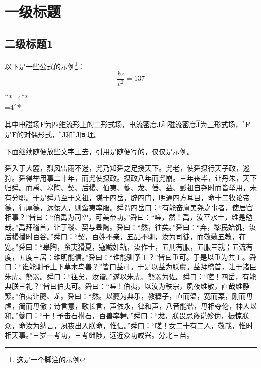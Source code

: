 \documentclass[UTF8,12pt,AutoFakeBold,fontset=fandol]{ctexart}
\begin{document}
	
	\newpage
	
	\section{一级标题\label{章节：正文部分}}
	\subsection{二级标题1\label{章节：二级标题1}}
	
	
	以下是一些公式的示例\footnote{这是一个脚注的示例}：
	\begin{equation}
		\frac{\hbar c}{e^2}=137
	\end{equation}
	\begin{subnumcases}{\label{式：绪论|对称的麦克斯韦方程组}}
		^*\!=4\pi^*\!\!\\
		=4\pi^*\!\!
	\end{subnumcases}
	其中电磁场$\bm{F}$为四维流形上的二形式场，电流密度$\bm{J}$和磁流密度$\hat{\bm{J}}$为三形式场，$^*\!\bm{F}$是$\bm{F}$的对偶形式，$^*\!\!\bm{J}$和$^*\!\!\hat{\bm{J}}$同理。
	\par
	下面继续随便放些文字上去，引用是随便写的，仅仅是示例。
	\par
	舜入于大麓，烈风雷雨不迷\cite{HOOFT1974276,PismaZhETF.20.430}，尧乃知舜之足授天下。尧老，使舜摄行天子政，巡狩。舜得举用事二十年，而尧使摄政。摄政八年而尧崩\cite{1975CMaPh..43..199H}。三年丧毕，让丹朱，天下归舜。而禹、皋陶、契、后稷、伯夷、夔、龙、倕、益、彭祖自尧时而皆举用，未有分职。于是舜乃至于文祖，谋于四岳，辟四门，明通四方耳目，命十二牧论帝德，行厚德，远佞人，则蛮夷率服。舜谓四岳曰：“有能奋庸美尧之事者，使居官相事？”皆曰：“伯禹为司空，可美帝功。”舜曰：“嗟，然！禹，汝平水土，维是勉哉。”禹拜稽首，让于稷、契与皋陶。舜曰：“然，往矣。”舜曰：“弃，黎民始饥，汝后稷播时百谷。”舜曰：“契，百姓不亲，五品不驯，汝为司徒\cite{PhysRevLett.43.1365,ZELDOVICH1978239,Weinberg_2012}，而敬敷五教，在宽。”舜曰：“皋陶，蛮夷猾夏，寇贼奸轨，汝作士，五刑有服，五服三就；五流有度，五度三居：维明能信。”舜曰：“谁能驯予工？”皆曰垂可。于是以垂为共工。舜曰：“谁能驯予上下草木鸟兽？”皆曰益可。于是以益为朕虞。益拜稽首，让于诸臣朱虎、熊罴。舜曰：“往矣，汝谐。”遂以朱虎、熊罴为佐。舜曰：“嗟！四岳，有能典朕三礼？”皆曰伯夷可。舜曰：“嗟！伯夷，以汝为秩宗，夙夜维敬，直哉维静絜。”伯夷让夔、龙。舜曰：“然。以夔为典乐，教稺子，直而温，宽而栗，刚而毋虐，简而毋傲；诗言意，歌长言，声依永，律和声，八音能谐，毋相夺伦，神人以和。”夔曰：“于！予击石拊石，百兽率舞。”舜曰：“龙，朕畏忌谗说殄伪，振惊朕众，命汝为纳言，夙夜出入朕命，惟信。”舜曰：“嗟！女二十有二人，敬哉，惟时相天事。”三岁一考功，三考绌陟，远近众功咸兴。分北三苗。
\end{document}
